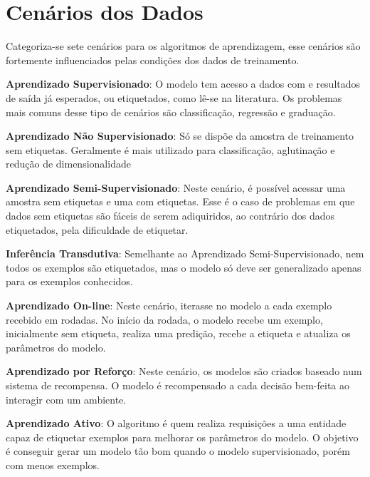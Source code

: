 \section{Cenários dos Dados}

Categoriza-se\cite{mohri2012foundations} sete cenários para os algoritmos de aprendizagem, esse cenários são fortemente influenciados pelas condições dos dados de treinamento.

\begin{description}
\item \textbf{Aprendizado Supervisionado}: O modelo tem acesso a dados com e resultados de saída já esperados, ou etiquetados, como lê-se na literatura. Os problemas mais comuns desse tipo de cenários são classificação, regressão e graduação.

\item \textbf{Aprendizado Não Supervisionado}: Só se dispõe da amostra de treinamento sem etiquetas. Geralmente é mais utilizado para classificação, aglutinação e redução de dimensionalidade

\item \textbf{Aprendizado Semi-Supervisionado}: Neste cenário, é possível acessar uma amostra sem etiquetas e uma com etiquetas. Esse é o caso de problemas em que dados sem etiquetas são fáceis de serem adiquiridos, ao contrário dos dados etiquetados, pela dificuldade de etiquetar.

\item \textbf{Inferência Transdutiva}: Semelhante ao Aprendizado Semi-Supervisionado, nem todos os exemplos são etiquetados, mas o modelo só deve ser generalizado apenas para os exemplos conhecidos.

\item \textbf{Aprendizado On-line}: Neste cenário, iterasse no modelo a cada exemplo recebido em rodadas. No início da rodada, o modelo recebe um exemplo, inicialmente sem etiqueta, realiza uma predição, recebe a etiqueta e atualiza os parâmetros do modelo.

\item \textbf{Aprendizado por Reforço}: Neste cenário, os modelos são criados baseado num sistema de recompensa. O modelo é recompensado a cada decisão bem-feita ao interagir com um ambiente.

\item \textbf{Aprendizado Ativo}: O algoritmo é quem realiza requisições a uma entidade capaz de etiquetar exemplos para melhorar os parâmetros do modelo. O objetivo é conseguir gerar um modelo tão bom quando o modelo supervisionado, porém com menos exemplos.

\end{description}

